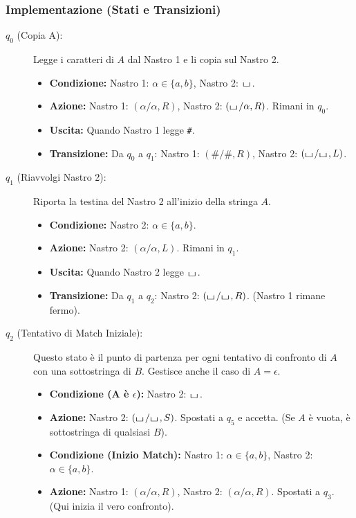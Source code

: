 \documentclass[a4paper]{article}
\theoremstyle{definition} %
\newcommand{\blankS}{\ensuremath{\raisebox{-0.15ex}{\scalebox{1.3}[0.7]{$\sqcup$}}\mkern2mu}}
\begin{document}
\subsubsection{Implementazione (Stati e Transizioni)}
\begin{description}
    \item[$q_0$ (Copia A):] Legge i caratteri di $A$ dal Nastro 1 e li copia sul Nastro 2.
    \begin{itemize}
        \item \textbf{Condizione:} Nastro 1: $\alpha \in \{a,b\}$, Nastro 2: $\blankS$.
        \item \textbf{Azione:} Nastro 1: $(\alpha/\alpha, R)$, Nastro 2: $(\blankS/\alpha, R)$. Rimani in $q_0$.
        \item \textbf{Uscita:} Quando Nastro 1 legge \texttt{\#}.
        \item \textbf{Transizione:} Da $q_0$ a $q_1$: Nastro 1: $(\#/\#, R)$, Nastro 2: $(\blankS/\blankS, L)$.
    \end{itemize}
    \item[$q_1$ (Riavvolgi Nastro 2):] Riporta la testina del Nastro 2 all'inizio della stringa $A$.
    \begin{itemize}
        \item \textbf{Condizione:} Nastro 2: $\alpha \in \{a,b\}$.
        \item \textbf{Azione:} Nastro 2: $(\alpha/\alpha, L)$. Rimani in $q_1$.
        \item \textbf{Uscita:} Quando Nastro 2 legge $\blankS$.
        \item \textbf{Transizione:} Da $q_1$ a $q_2$: Nastro 2: $(\blankS/\blankS, R)$. (Nastro 1 rimane fermo).
    \end{itemize}
    \item[$q_2$ (Tentativo di Match Iniziale):] Questo stato è il punto di partenza per ogni tentativo di confronto di $A$ con una sottostringa di $B$. Gestisce anche il caso di $A = \epsilon$.
    \begin{itemize}
        \item \textbf{Condizione (A è $\epsilon$):} Nastro 2: $\blankS$.
        \item \textbf{Azione:} Nastro 2: $(\blankS/\blankS, S)$. Spostati a $q_5$ e accetta. (Se $A$ è vuota, è sottostringa di qualsiasi $B$).
        \item \textbf{Condizione (Inizio Match):} Nastro 1: $\alpha \in \{a,b\}$, Nastro 2: $\alpha \in \{a,b\}$.
        \item \textbf{Azione:} Nastro 1: $(\alpha/\alpha, R)$, Nastro 2: $(\alpha/\alpha, R)$. Spostati a $q_3$. (Qui inizia il vero confronto).

\end{itemize}
\end{description}
\end{document}
